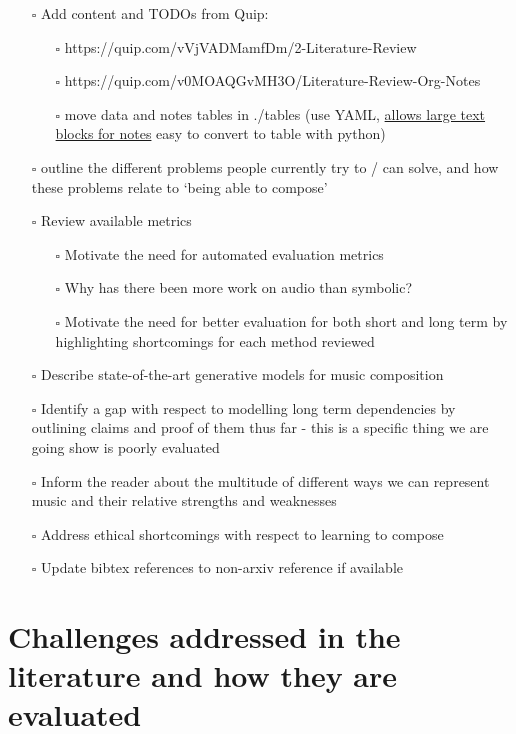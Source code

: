 \documentclass[12pt,a4paper,]{report}
\providecommand{\tightlist}{%
  \setlength{\itemsep}{0pt}\setlength{\parskip}{0pt}}
\begin{document}
\begin{itemize}
\tightlist
\item[$\square$]
  Add content and TODOs from Quip:

  \begin{itemize}
  \tightlist
  \item[$\square$]
    https://quip.com/vVjVADMamfDm/2-Literature-Review
  \item[$\square$]
    https://quip.com/v0MOAQGvMH3O/Literature-Review-Org-Notes
  \item[$\square$]
    move data and notes tables in ./tables (use YAML,
    \href{https://stackoverflow.com/a/3790497/2550114}{allows large text
    blocks for notes} easy to convert to table with python)
  \end{itemize}
\item[$\square$]
  outline the different problems people currently try to / can solve,
  and how these problems relate to `being able to compose'
\item[$\square$]
  Review available metrics

  \begin{itemize}
  \tightlist
  \item[$\square$]
    Motivate the need for automated evaluation metrics
  \item[$\square$]
    Why has there been more work on audio than symbolic?
  \item[$\square$]
    Motivate the need for better evaluation for both short and long term
    by highlighting shortcomings for each method reviewed
  \end{itemize}
\item[$\square$]
  Describe state-of-the-art generative models for music composition
\item[$\square$]
  Identify a gap with respect to modelling long term dependencies by
  outlining claims and proof of them thus far - this is a specific thing
  we are going show is poorly evaluated
\item[$\square$]
  Inform the reader about the multitude of different ways we can
  represent music and their relative strengths and weaknesses
\item[$\square$]
  Address ethical shortcomings with respect to learning to compose
\item[$\square$]
  Update bibtex references to non-arxiv reference if available
\end{itemize}

\hypertarget{challenges-addressed-in-the-literature-and-how-they-are-evaluated}{%
\section{Challenges addressed in the literature and how they are
evaluated}\label{challenges-addressed-in-the-literature-and-how-they-are-evaluated}}
\end{document}
